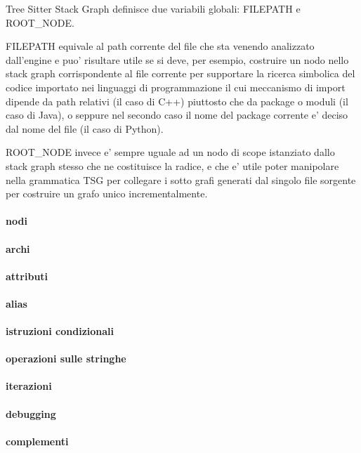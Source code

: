 Tree Sitter Stack Graph definisce due variabili globali: FILEPATH e ROOT\_NODE.

FILEPATH equivale al path corrente del file che sta venendo analizzato dall'engine e puo' risultare utile se si deve, per esempio, costruire un nodo nello stack graph corrispondente al file corrente per supportare la ricerca simbolica del codice importato nei linguaggi di programmazione il cui meccanismo di import dipende da path relativi (il caso di C++) piuttosto che da package o moduli (il caso di Java), o seppure nel secondo caso il nome del package corrente e' deciso dal nome del file (il caso di Python).

ROOT\_NODE invece e' sempre uguale ad un nodo di scope istanziato dallo stack graph stesso che ne costituisce la radice, e che e' utile poter manipolare nella grammatica TSG per collegare i sotto grafi generati dal singolo file sorgente per costruire un grafo unico incrementalmente.

\paragraph{nodi}

\paragraph{archi}

\paragraph{attributi}

\paragraph{alias}

\paragraph{istruzioni condizionali}

\paragraph{operazioni sulle stringhe}

\paragraph{iterazioni}

\paragraph{debugging}

\paragraph{complementi}
